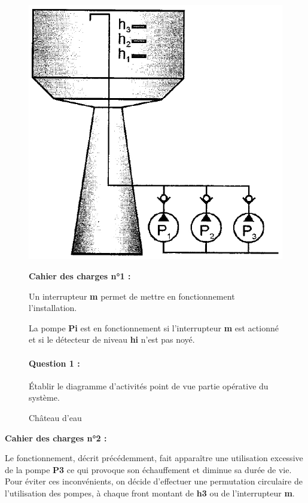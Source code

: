 \begin{figure}[!h]
 \begin{minipage}{0.4\linewidth}
  \begin{center}
   \includegraphics[width=0.9\linewidth]{img/Chateau_schema.png}
   \caption{Château d'eau}
   \label{img4}
  \end{center}
 \end{minipage}
 \hfill
 \begin{minipage}{0.55\linewidth}
  \textbf{Cahier des charges n°1 :}

  Un interrupteur \textbf{m} permet de mettre en fonctionnement l'installation.

  La pompe \textbf{Pi} est en fonctionnement si l'interrupteur \textbf{m} est actionné et si le détecteur de niveau \textbf{hi} n'est pas noyé.

 \paragraph{Question 1 :} Établir le diagramme d'activités point de vue partie opérative du système.
  
 \end{minipage}
\end{figure}

\textbf{Cahier des charges n°2 :}

Le fonctionnement, décrit précédemment, fait apparaître une utilisation excessive de la pompe \textbf{P3} ce qui provoque son échauffement et diminue sa durée de vie. Pour éviter ces inconvénients, on décide d'effectuer une permutation circulaire de l'utilisation des pompes, à chaque front montant de \textbf{h3} ou de l'interrupteur \textbf{m}.

